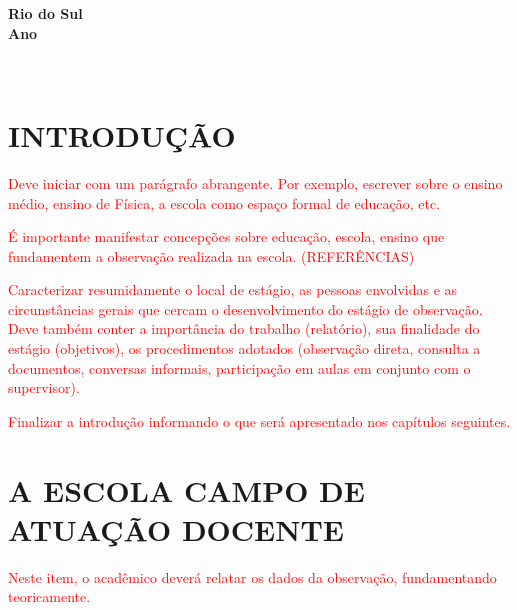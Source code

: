 \documentclass[12pt,a4paper]{article}
\begin{document}
    \vfill

    \begin{center}
        \textbf{Rio do Sul\\
        Ano}
    \end{center}





\newpage

\thispagestyle{empty} 

\

\newpage

\thispagestyle{empty} 
\tableofcontents
\newpage
\section{INTRODUÇÃO}

        \textcolor{red}{Deve iniciar com um parágrafo abrangente. Por exemplo, escrever sobre o ensino médio, ensino de Física, a escola como espaço formal de educação, etc.}
        
        \textcolor{red}{É importante manifestar concepções sobre educação, escola, ensino que fundamentem a observação realizada na escola. (REFERÊNCIAS)}
        
        \textcolor{red}{Caracterizar resumidamente o local de estágio, as pessoas envolvidas e as circunstâncias gerais que cercam o desenvolvimento do estágio de observação. Deve também conter a importância do trabalho (relatório), sua finalidade do estágio (objetivos), os procedimentos adotados (observação direta, consulta a documentos, conversas informais, participação em aulas em conjunto com o supervisor).}


        \textcolor{red}{Finalizar a introdução informando o que será apresentado nos capítulos seguintes.}

\newpage


\section{A ESCOLA CAMPO DE ATUAÇÃO DOCENTE}

        \textcolor{red}{Neste item, o acadêmico deverá relatar os dados da observação, fundamentando teoricamente.}
        
\end{document}
